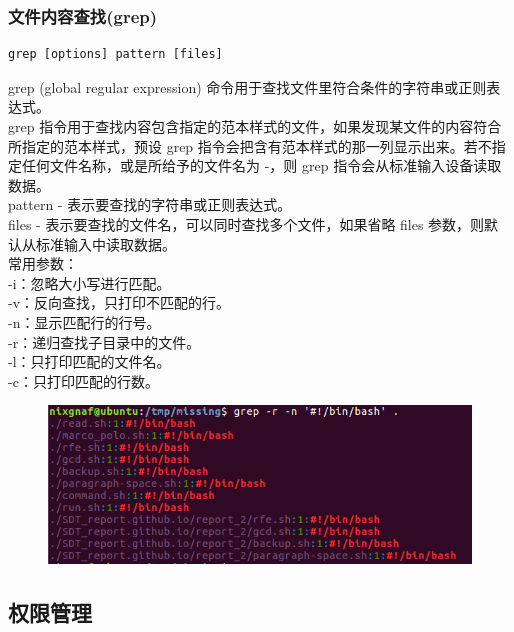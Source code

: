 \documentclass{article}
\begin{document}
\subsubsection{文件内容查找(grep)}
\begin{lstlisting}[style=myStyle]
grep [options] pattern [files]
\end{lstlisting}
grep (global regular expression) 命令用于查找文件里符合条件的字符串或正则表达式。\\
grep 指令用于查找内容包含指定的范本样式的文件，如果发现某文件的内容符合所指定的范本样式，预设 grep 指令会把含有范本样式的那一列显示出来。若不指定任何文件名称，或是所给予的文件名为 -，则 grep 指令会从标准输入设备读取数据。\\
pattern - 表示要查找的字符串或正则表达式。\\
files - 表示要查找的文件名，可以同时查找多个文件，如果省略 files 参数，则默认从标准输入中读取数据。\\
常用参数：\\
-i：忽略大小写进行匹配。\\
-v：反向查找，只打印不匹配的行。\\
-n：显示匹配行的行号。\\
-r：递归查找子目录中的文件。\\
-l：只打印匹配的文件名。\\
-c：只打印匹配的行数。\\
\begin{figure}[h]
    \centering
    \includegraphics[width=0.5\linewidth]{image20.png}
\end{figure}

\subsection{权限管理}
\end{document}
